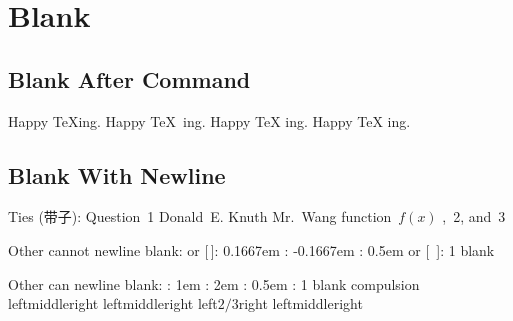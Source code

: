 \section{Blank}
\subsection{Blank After Command}
Happy \TeX ing. Happy \TeX\ ing. Happy \TeX{} ing. Happy {\TeX} ing.

\subsection{Blank With Newline}
Ties (带子): \newline
Question~1      \newline    %
Donald~E. Knuth \newline    %
Mr.~Wang        \newline    %
function~$f(x)$ ,~2, and~3                 %

Other cannot newline blank: \newline
[\thinspace] or [\,]: 0.1667em  \newline    %
[\negthinspace]: -0.1667em      \newline    %
[\enspace]: 0.5em               \newline
[\nobreakspace] or [~]: 1 blank

Other can newline blank:    \newline
[\quad]: 1em                                        \newline    %
[\qquad]: 2em                                       \newline    %
[\enskip]: 0.5em                                    \newline
[\ ]: 1 blank                                       \newline
[\hspace{1cm plus 0.5cm minus 0.25cm}]              \newline    %
\hspace*{1cm}compulsion                             \newline    %
left\hspace{\fill}middle\hspace{\fill}right         \newline    %
left\hfill middle\hfill right                       \newline    %
left$2/3$\hspace{\fill}right    \newline
left\hrulefill middle\dotfill right

